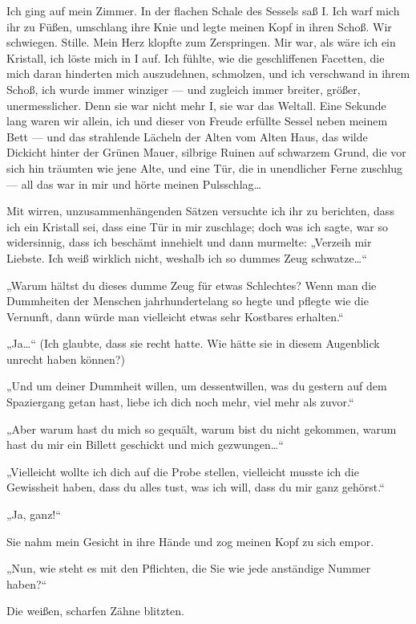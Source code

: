 Ich ging auf mein Zimmer. In der flachen Schale des Sessels saß I.
Ich warf mich ihr zu Füßen, umschlang ihre Knie und legte meinen
Kopf in ihren Schoß. Wir schwiegen. Stille. Mein Herz klopfte zum
Zerspringen. Mir war, als wäre ich ein Kristall, ich löste mich in
I auf. Ich fühlte, wie die geschliffenen Facetten, die mich daran
hinderten mich auszudehnen, schmolzen, und ich verschwand in ihrem
Schoß, ich wurde immer winziger — und zugleich immer breiter,
größer, unermesslicher. Denn sie war nicht mehr I, sie war das
Weltall. Eine Sekunde lang waren wir allein, ich und dieser von
Freude erfüllte Sessel neben
meinem Bett — und das strahlende Lächeln der Alten vom Alten Haus,
das wilde Dickicht hinter der Grünen Mauer, silbrige Ruinen auf
schwarzem Grund, die vor sich hin träumten wie jene Alte, und eine
Tür, die in unendlicher Ferne zuschlug — all das war in mir und
hörte meinen Pulsschlag\ldots{}

Mit wirren, unzusammenhängenden Sätzen versuchte ich ihr zu
berichten, dass ich ein Kristall sei, dass eine Tür in mir
zuschlage; doch was ich sagte, war so widersinnig, dass ich
beschämt innehielt und dann murmelte: „Verzeih mir Liebste. Ich
weiß wirklich nicht, weshalb ich so dummes Zeug schwatze\ldots{}“

„Warum hältst du dieses dumme Zeug für etwas Schlechtes? Wenn man
die Dummheiten der Menschen jahrhundertelang so hegte und pflegte
wie die Vernunft, dann würde man vielleicht etwas sehr Kostbares
erhalten.“

„Ja\ldots{}“ (Ich glaubte, dass sie recht hatte. Wie hätte
sie in diesem Augenblick unrecht haben können?)

„Und um deiner
Dummheit willen, um dessentwillen, was du gestern auf dem
Spaziergang getan hast, liebe ich dich noch mehr, viel mehr als
zuvor.“

„Aber warum hast du mich so gequält, warum bist du nicht
gekommen, warum hast du mir ein Billett geschickt und mich
gezwungen\ldots{}“

„Vielleicht wollte ich dich auf die Probe stellen, vielleicht
musste ich die Gewissheit haben, dass du alles tust, was ich will,
dass du mir ganz gehörst.“

„Ja, ganz!“

Sie nahm mein Gesicht in ihre Hände und zog meinen Kopf zu sich
empor.

„Nun, wie steht es mit den Pflichten, die Sie wie jede anständige
Nummer haben?“

Die weißen, scharfen Zähne blitzten.

